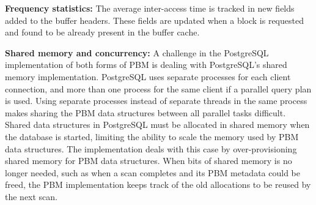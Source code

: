 




\textbf{Frequency statistics:} The average inter-access time is tracked in new fields added to the buffer headers. These fields are updated when a block is requested and found to be already present in the buffer cache.


\textbf{Shared memory and concurrency:} A challenge in the PostgreSQL implementation of both forms of PBM is dealing with PostgreSQL's shared memory implementation. PostgreSQL uses separate processes for each client connection, and more than one process for the same client if a parallel query plan is used. Using separate processes instead of separate threads in the same process makes sharing the PBM data structures between all parallel tasks difficult. Shared data structures in PostgreSQL must be allocated in shared memory when the database is started, limiting the ability to scale the memory used by PBM data structures. The implementation deals with this case by over-provisioning shared memory for PBM data structures. When bits of shared memory is no longer needed, such as when a scan completes and its PBM metadata could be freed, the PBM implementation keeps track of the old allocations to be reused by the next scan.



